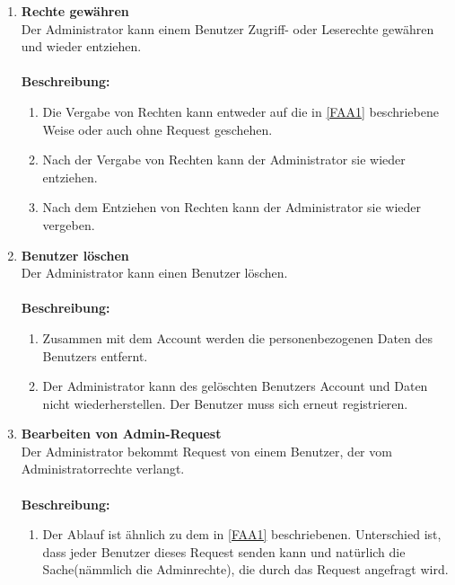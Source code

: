 \documentclass[parskip=full,11pt]{scrartcl}
\def\threedigits#1{%
  \ifnum#1<10 0\fi
  \ifnum#1<1 0\fi
  \number#1}
\begin{document}
\begin{enumerate}[label={\textbf{/F\protect\threedigits{\theenumi}0/}}, leftmargin=*, resume]
\newpage
\item \label{FAA3} \textbf{Rechte gewähren}\\ Der Administrator kann einem Benutzer Zugriff- oder Leserechte gewähren und wieder entziehen.\\\\
\textbf{Beschreibung:}\\
\begin{enumerate}[label=(\arabic*), leftmargin=*]
	\item Die Vergabe von Rechten kann entweder auf die in \ref{FAA1} beschriebene Weise oder auch ohne Request geschehen.\\
	\item Nach der Vergabe von Rechten kann der Administrator sie wieder entziehen. \\ 
	\item Nach dem Entziehen von Rechten kann der Administrator sie wieder vergeben. \\
	\end{enumerate}

\item \label{FAA4} \textbf{Benutzer löschen}\\ Der Administrator kann einen Benutzer löschen. \\\\
\textbf{Beschreibung:}\\
\begin{enumerate}[label=(\arabic*), leftmargin=*]
	\item Zusammen mit dem Account werden die personenbezogenen Daten des Benutzers entfernt.\\
	\item Der Administrator kann des gelöschten Benutzers Account und Daten nicht wiederherstellen. Der Benutzer muss sich erneut registrieren. \\ 
	\end{enumerate}

\item \label{FAA5} \colorbox{shadecolor} {\textbf{Bearbeiten von Admin-Request}}\\ Der Administrator bekommt Request von einem Benutzer, der vom Administratorrechte verlangt.\\\\
\textbf{Beschreibung:}\\
\begin{enumerate}[label=(\arabic*), leftmargin=*]
	\item Der Ablauf ist ähnlich zu dem in \ref{FAA1} beschriebenen. Unterschied ist, dass jeder Benutzer dieses Request senden kann und natürlich die Sache(nämmlich die Adminrechte), die durch das Request angefragt wird.\\ %
	\end{enumerate}




\end{enumerate}
\end{document}
